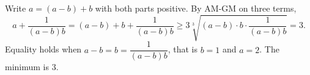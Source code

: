 Write $a=(a-b)+b$ with both parts positive. By AM-GM on three terms,
\[a+\dfrac1{(a-b)b}=(a-b)+b+\dfrac1{(a-b)b}\ge3\sqrt[3]{(a-b)\cdot b\cdot\dfrac1{(a-b)b}}=3.\]
Equality holds when $a-b=b=\dfrac1{(a-b)b}$, that is $b=1$ and $a=2$. The minimum is $\boxed{3}$.
